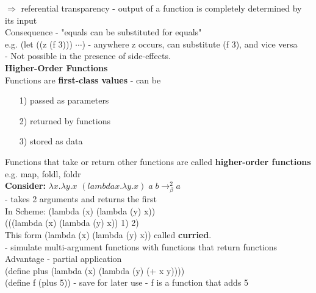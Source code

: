 \documentclass[11pt]{article}
\begin{document}
$\Rightarrow$ referential transparency - output of a function is completely determined by its input \\

Consequence - "equals can be substituted for equals" \\

e.g. (let ((z (f 3))) $\cdots$) - anywhere z occurs, can substitute (f 3), and vice versa\\

- Not possible in the presence of side-effects. \\

\textbf{Higher-Order Functions} \\

Functions are {\bf first-class values} - can be
\begin{itemize}
	\item[1)]  passed as parameters
	\item[2)] returned by functions
	\item[3)] stored as data
\end{itemize}

Functions that take or return other functions are called {\bf higher-order functions}  \\

e.g. map, foldl, foldr\\

{\bf Consider:} $\lambda x.\lambda y.x$  $(lambda x.\lambda y.x)\;a\;b \rightarrow_\beta^2 a$ \\

- takes 2 arguments and returns the first \\

In Scheme: (lambda (x) (lambda (y) x)) \\

(((lambda (x) (lambda (y) x)) 1) 2) \\

This form (lambda (x) (lambda (y) x)) called {\bf curried}. \\

- simulate multi-argument functions with functions that return functions \\

Advantage - partial application \\

(define plus (lambda (x) (lambda (y) (+ x y)))) \\

(define f (plus 5)) - save for later use - f is a function that adds 5\\
\end{document}
